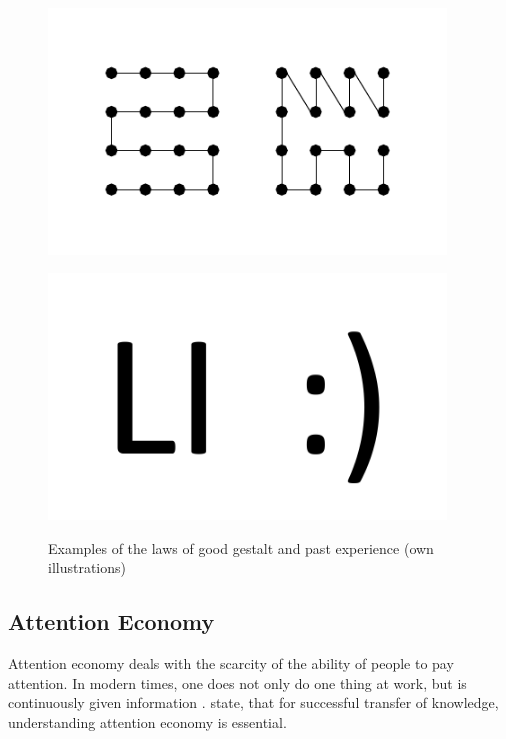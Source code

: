 \begin{enumerate}
    \begin{figure}[H] 
        \begin{minipage}[b]{.5\linewidth}
            \centering\includegraphics[width=0.94\textwidth]{img/gestalt.pdf}
            \label{fig:gest}
        \end{minipage}%
        \begin{minipage}[b]{.5\linewidth}
            \centering\includegraphics[width=0.94\textwidth]{img/experience.pdf}
            \label{fig:exo}
        \end{minipage}
        \caption[Laws of Good Gestalt and Past Experience]{Examples of the laws of good gestalt and past experience (own illustrations)}\label{fig:law4}
    \end{figure}
\end{enumerate}


\subsection{Attention Economy \label{ssec:attention}}\label{beginAtt}
Attention economy deals with the scarcity of the ability of people to pay attention. In modern times, one does not only do one thing at work, but is continuously given information  \parencite[cf.][]{Davenport.2001}. \textcite{Davenport.2001} state, that for successful transfer of knowledge, understanding attention economy is essential. 

